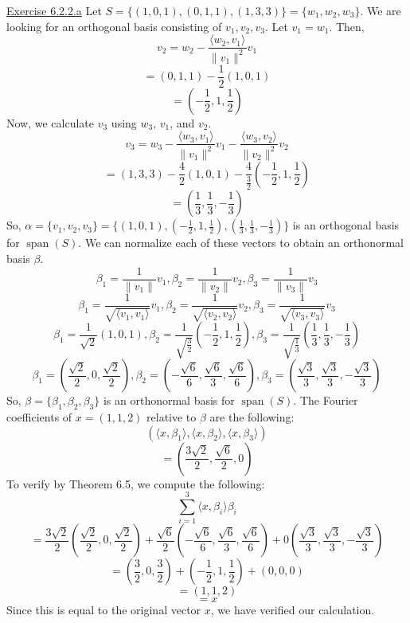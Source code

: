 \documentclass{exam}
\begin{document}
\underline{Exercise 6.2.2.a}
\newline
\newline
Let $S=\{(1,0,1),(0,1,1),(1,3,3)\}=\{w_1,w_2,w_3\}$. We are looking for an orthogonal basis consisting of $v_1,v_2,v_3$. Let $v_1=w_1$. Then,
\[v_2=w_2-\frac{\langle w_2,v_1\rangle}{\|v_1\|^2}v_1\]
\[=(0,1,1)-\frac{1}{2}(1,0,1)\]
\[=\left(-\frac{1}{2},1,\frac{1}{2}\right)\]
Now, we calculate $v_3$ using $w_3$, $v_1$, and $v_2$.
\[v_3=w_3-\frac{\langle w_3,v_1\rangle}{\|v_1\|^2}v_1-\frac{\langle w_3,v_2\rangle}{\|v_2\|^2}v_2\]
\[=(1,3,3)-\frac{4}{2}(1,0,1)-\frac{4}{\frac{3}{2}}\left(-\frac{1}{2},1,\frac{1}{2}\right)\]
\[=\left(\frac{1}{3},\frac{1}{3},-\frac{1}{3}\right)\]
So, $\alpha=\{v_1,v_2,v_3\}=\{(1,0,1),\left(-\frac{1}{2},1,\frac{1}{2}\right),\left(\frac{1}{3},\frac{1}{3},-\frac{1}{3}\right)\}$ is an orthogonal basis for $\operatorname{span}(S)$. We can normalize each of these vectors to obtain an orthonormal basis $\beta$.
\[\beta_1=\frac{1}{\|v_1\|}v_1,\beta_2=\frac{1}{\|v_2\|}v_2,\beta_3=\frac{1}{\|v_3\|}v_3\]
\[\beta_1=\frac{1}{\sqrt{\langle v_1,v_1\rangle}}v_1,\beta_2=\frac{1}{\sqrt{\langle v_2,v_2\rangle}}v_2,\beta_3=\frac{1}{\sqrt{\langle v_3,v_3\rangle}}v_3\]
\[\beta_1=\frac{1}{\sqrt{2}}(1,0,1),\beta_2=\frac{1}{\sqrt{\frac{3}{2}}}\left(-\frac{1}{2},1,\frac{1}{2}\right),\beta_3=\frac{1}{\sqrt{\frac{1}{3}}}\left(\frac{1}{3},\frac{1}{3},-\frac{1}{3}\right)\]
\[\beta_1=\left(\frac{\sqrt{2}}{2},0,\frac{\sqrt{2}}{2}\right),\beta_2=\left(-\frac{\sqrt{6}}{6},\frac{\sqrt{6}}{3},\frac{\sqrt{6}}{6}\right),\beta_3=\left(\frac{\sqrt{3}}{3},\frac{\sqrt{3}}{3},-\frac{\sqrt{3}}{3}\right)\]
So, $\beta=\{\beta_1,\beta_2,\beta_3\}$ is an orthonormal basis for $\operatorname{span}(S)$. The Fourier coefficients of $x=(1,1,2)$ relative to $\beta$ are the following:
\[(\langle x,\beta_1\rangle,\langle x,\beta_2\rangle,\langle x,\beta_3\rangle)\]
\[=\left(\frac{3\sqrt{2}}{2},\frac{\sqrt{6}}{2},0\right)\]
To verify by Theorem 6.5, we compute the following:
\[\sum_{i=1}^{3}\langle x,\beta_i\rangle\beta_i\]
\[=\frac{3\sqrt{2}}{2}\left(\frac{\sqrt{2}}{2},0,\frac{\sqrt{2}}{2}\right)+\frac{\sqrt{6}}{2}\left(-\frac{\sqrt{6}}{6},\frac{\sqrt{6}}{3},\frac{\sqrt{6}}{6}\right)+0\left(\frac{\sqrt{3}}{3},\frac{\sqrt{3}}{3},-\frac{\sqrt{3}}{3}\right)\]
\[=\left(\frac{3}{2},0,\frac{3}{2}\right)+\left(-\frac{1}{2},1,\frac{1}{2}\right)+(0,0,0)\]
\[=(1,1,2)\]
\[=x\]
Since this is equal to the original vector $x$, we have verified our calculation.
\newline
\end{document}
